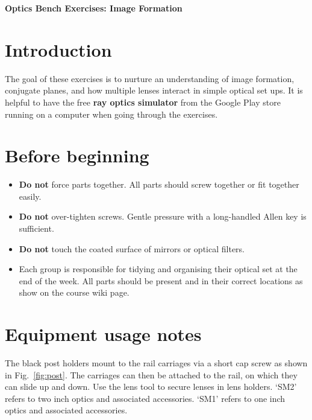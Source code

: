 \documentclass[a4paper]{report}
\begin{document}
\setcounter{secnumdepth}{2}

\begin{center}
\textbf{\Large{Optics Bench Exercises: Image Formation}}
\end{center}

\section{Introduction}
The goal of these exercises is to nurture an understanding of image formation, conjugate planes, and how multiple lenses interact in simple optical set ups.
It is helpful to have the free \textbf{ray optics simulator} from the Google Play store running on a computer when going through the exercises. 


\section{Before beginning}
\begin{itemize}
    \item \textbf{Do not} force parts together. All parts should screw together or fit together easily.
    \item \textbf{Do not} over-tighten screws. Gentle pressure with a long-handled Allen key is sufficient. 
    \item \textbf{Do not} touch the coated surface of mirrors or optical filters. 
    \item Each group is responsible for tidying and organising their optical set at the end of the week. All parts should be present and in their correct locations as show on the course wiki page. 

\end{itemize}

\section{Equipment usage notes}
The black post holders mount to the rail carriages via a short cap screw as shown in Fig.~\ref{fig:post}. 
The carriages can then be attached to the rail, on which they can slide up and down. 
Use the lens tool to secure lenses in lens holders. 
`SM2' refers to two inch optics and associated accessories. 
`SM1' refers to one inch optics and associated accessories. 
\end{document}
